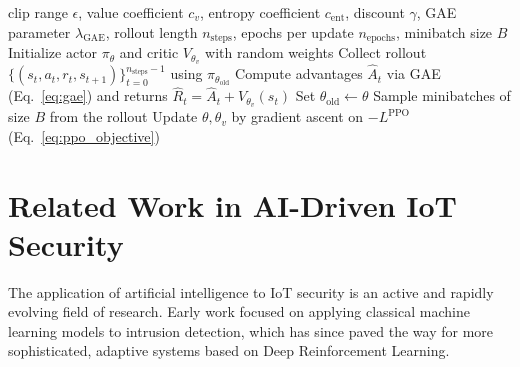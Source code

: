 \begin{algorithm}[!htbp]
\caption{Proximal Policy Optimization (PPO) --- training loop \cite{Schulman2017}}
\label{alg:ppo}
\begin{algorithmic}
\REQUIRE clip range $\epsilon$, value coefficient $c_v$, entropy coefficient $c_{\mathrm{ent}}$, discount $\gamma$, GAE parameter $\lambda_{\text{GAE}}$, rollout length $n_{\text{steps}}$, epochs per update $n_{\text{epochs}}$, minibatch size $B$
\STATE Initialize actor $\pi_\theta$ and critic $V_{\theta_v}$ with random weights
    \STATE Collect rollout $\{(s_t, a_t, r_t, s_{t+1})\}_{t=0}^{n_{\text{steps}}-1}$ using $\pi_{\theta_{\text{old}}}$
    \STATE Compute advantages $\hat{A}_t$ via GAE (Eq.~\eqref{eq:gae}) and returns $\hat{R}_t = \hat{A}_t + V_{\theta_v}(s_t)$
    \STATE Set $\theta_{\text{old}} \leftarrow \theta$
        \STATE Sample minibatches of size $B$ from the rollout
        \STATE Update $\theta, \theta_v$ by gradient ascent on $-L^{\mathrm{PPO}}$ (Eq.~\eqref{eq:ppo_objective})
    \ENDFOR
\ENDFOR
\end{algorithmic}
\end{algorithm}

\section{Related Work in AI-Driven IoT Security}\label{sec:related_work_iot}
The application of artificial intelligence to IoT security is an active and rapidly evolving field of research. Early work focused on applying classical machine learning models to intrusion detection, which has since paved the way for more sophisticated, adaptive systems based on Deep Reinforcement Learning.

